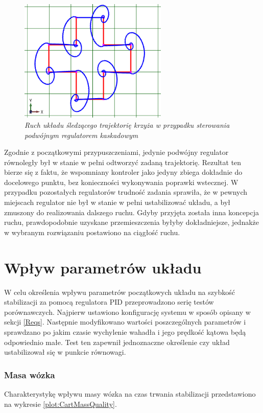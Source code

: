 \documentclass[12pt, oneside]{report}
\theoremstyle{definition}
\begin{document}
\begin{figure}[H]
	\centering
		\includegraphics[width = 200pt]{TrajectoryCrossCascade} 
		\caption{\textit{Ruch układu śledzącego trajektorię krzyża w przypadku sterowania podwójnym regulatorem kaskadowym}}
		\label{TrajectoryCrossCascade}
\end{figure}

Zgodnie z początkowymi przypuszczeniami, jedynie podwójny regulator równoległy był w stanie w pełni odtworzyć zadaną trajektorię. Rezultat ten bierze się z faktu, że wspomniany kontroler jako jedyny zbiega dokładnie do docelowego punktu, bez konieczności wykonywania poprawki wstecznej. W przypadku pozostałych regulatorów trudność zadania sprawiła, że w pewnych miejscach regulator nie był w stanie w pełni ustabilizować układu, a był zmuszony do realizowania dalszego ruchu. Gdyby przyjęta została inna koncepcja ruchu, prawdopodobnie uzyskane przemieszczenia byłyby dokładniejsze, jednakże w wybranym rozwiązaniu postawiono na ciągłość ruchu.


\section{Wpływ parametrów układu}
W celu określenia wpływu parametrów początkowych układu na szybkość stabilizacji za pomocą regulatora PID przeprowadzono serię testów porównawczych. Najpierw ustawiono konfigurację systemu w sposób opisany w sekcji \ref{Reqs}. Następnie modyfikowano wartości poszczególnych parametrów i sprawdzano po jakim czasie wychylenie wahadła i jego prędkość kątowa będą odpowiednio małe. Test ten zapewnił jednoznaczne określenie czy układ ustabilizował się w punkcie równowagi. 

\newpage
\subsubsection{Masa wózka}
Charakterystykę wpływu masy wózka na czas trwania stabilizacji przedstawiono na wykresie \ref{plot:CartMassQuality}.
\end{document}
